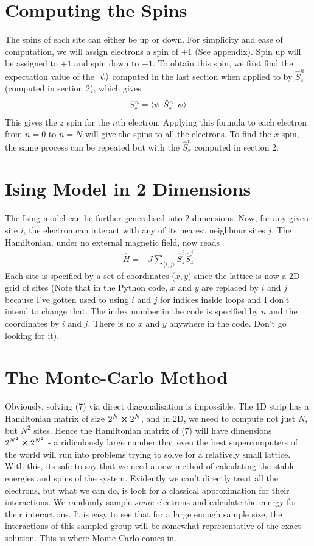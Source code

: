 \documentclass{article}
\newcommand{\la}{\langle}
\newcommand{\ra}{\rangle}
\begin{document}
\section{Computing the Spins}
The spins of each site can either be up or down. For simplicity and 
ease of computation, we will assign electrons 
a spin of $\pm1$ (See appendix). Spin up will be 
assigned to $+1$ and spin down to $-1$. To obtain this spin, we first find the expectation value of the $\ket{\psi}$ computed in the last section 
when applied to by $\hat{S}^n_z$ (computed in section 2), which gives 
\begin{align}
    S^n_z=\bra{\psi}\hat{S}^n_z\ket{\psi}
\end{align}
This gives the $z$ spin for the $n$th electron. 
Applying this formula to each electron from $n=0$ to $n=N$ will give the spins to all the electrons. To find the $x$-spin, 
the same process can be repeated but with the $\hat{S}^n_x$ computed in section 2.

\section{Ising Model in 2 Dimensions}
The Ising model can be further generalised into 2 dimensions. Now, for any 
given site $i$, 
the electron can interact with any of its nearest neighbour 
sites $j$. The Hamiltonian, under no external magnetic field, now reads 
\begin{align}
    \hat{H}=-J\sum_{\la i,j\ra}\hat{S}_z^i \hat{S}_z^{j}
\end{align}
Each site is specified by a set of coordinates ($x,y$) 
since the lattice is now a 2D grid of sites (Note that in the Python code, $x$ and $y$ are replaced by $i$ and $j$ because 
I've gotten used to using $i$ and $j$ for 
indices inside loops and I don't intend to change that. 
The index number in the code is specified by $n$ and the coordinates by $i$ and $j$.
 There is no $x$ and $y$ anywhere in the code. Don't go looking for it). 

\section{The Monte-Carlo Method}
Obviously, solving (7) via direct diagonalisation is impossible. The 1D strip has a
Hamiltonian matrix of 
size $2^N\cross 2^N$, and in 2D, we need to compute not just $N$, but $N^2$ sites. Hence the 
Hamiltonian matrix of (7) will have dimensions $2^{N^2}\cross 2^{N^2}$ - a ridiculously large number that 
 even the best supercomputers of the world will run into problems trying to solve for a relatively small lattice. 
With this, its safe to say that we need a new method of calculating the stable
 energies and spins of the system.
  Evidently we can't directly treat all the electrons, but what we can do, is look for a 
  classical approximation for their interactions. 
We randomly sample $some$ electrons and calculate the energy for their interactions. 
It is easy to see that for a large enough sample size, 
the interactions of this sampled group will be somewhat 
representative of the exact solution. This is where Monte-Carlo comes in. 
\end{document}
